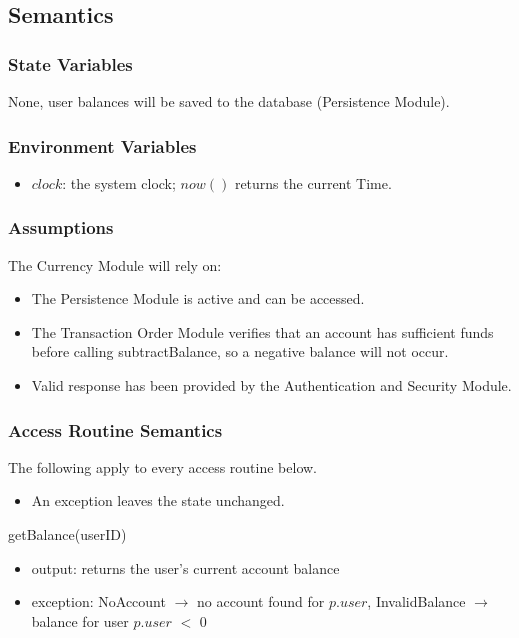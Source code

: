 \documentclass[12pt, titlepage]{article}
\begin{document}
\subsection{Semantics}

\subsubsection{State Variables}
None, user balances will be saved to the database (Persistence Module).

\subsubsection{Environment Variables}
\begin{itemize}
    \item $\mathit{clock}$: the system clock; $\mathit{now}()$ returns the current Time.
\end{itemize}

\subsubsection{Assumptions}
The Currency Module will rely on:
\begin{itemize}
    \item The Persistence Module is active and can be accessed.
    \item The Transaction Order Module verifies that an account has sufficient funds before calling subtractBalance, so a negative balance will not occur.
    \item Valid response has been provided by the Authentication and Security Module.
\end{itemize}

\subsubsection{Access Routine Semantics}
\noindent The following apply to every access routine below.
\begin{itemize}
    \item An exception leaves the state unchanged.
\end{itemize}

\noindent getBalance(userID)
\begin{itemize}
    \item output: returns the user's current account balance
    \item exception: NoAccount $\longrightarrow$ no account found for $p.\mathit{user}$, InvalidBalance $\longrightarrow$ balance for user  $p.\mathit{user}$ $<$ 0
\end{itemize}
\end{document}

